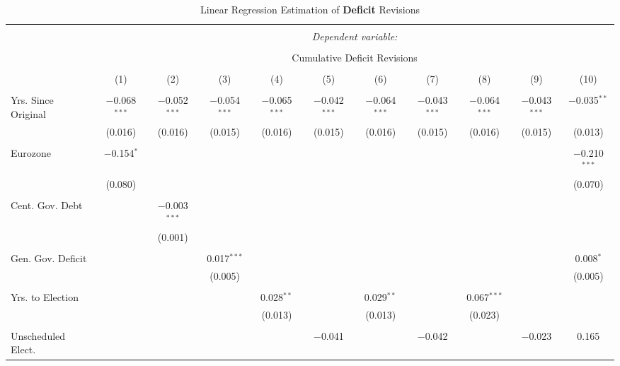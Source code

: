 
\begin{table}[!htbp] \centering 
  \caption{Linear Regression Estimation of \textbf{Deficit} Revisions} 
  \label{deficit_results} 
\tiny 
\begin{tabular}{@{\extracolsep{5pt}}lcccccccccc} 
\\[-1.8ex]\hline 
\hline \\[-1.8ex] 
 & \multicolumn{10}{c}{\textit{Dependent variable:}} \\ 
\cline{2-11} 
\\[-1.8ex] & \multicolumn{10}{c}{Cumulative Deficit Revisions} \\ 
\\[-1.8ex] & (1) & (2) & (3) & (4) & (5) & (6) & (7) & (8) & (9) & (10)\\ 
\hline \\[-1.8ex] 
 Yrs. Since Original & $-$0.068$^{***}$ & $-$0.052$^{***}$ & $-$0.054$^{***}$ & $-$0.065$^{***}$ & $-$0.042$^{***}$ & $-$0.064$^{***}$ & $-$0.043$^{***}$ & $-$0.064$^{***}$ & $-$0.043$^{***}$ & $-$0.035$^{**}$ \\ 
  & (0.016) & (0.016) & (0.015) & (0.016) & (0.015) & (0.016) & (0.015) & (0.016) & (0.015) & (0.013) \\ 
  & & & & & & & & & & \\ 
 Eurozone & $-$0.154$^{*}$ &  &  &  &  &  &  &  &  & $-$0.210$^{***}$ \\ 
  & (0.080) &  &  &  &  &  &  &  &  & (0.070) \\ 
  & & & & & & & & & & \\ 
 Cent. Gov. Debt &  & $-$0.003$^{***}$ &  &  &  &  &  &  &  &  \\ 
  &  & (0.001) &  &  &  &  &  &  &  &  \\ 
  & & & & & & & & & & \\ 
 Gen. Gov. Deficit &  &  & 0.017$^{***}$ &  &  &  &  &  &  & 0.008$^{*}$ \\ 
  &  &  & (0.005) &  &  &  &  &  &  & (0.005) \\ 
  & & & & & & & & & & \\ 
 Yrs. to Election &  &  &  & 0.028$^{**}$ &  & 0.029$^{**}$ &  & 0.067$^{***}$ &  &  \\ 
  &  &  &  & (0.013) &  & (0.013) &  & (0.023) &  &  \\ 
  & & & & & & & & & & \\ 
 Unscheduled Elect. &  &  &  &  & $-$0.041 &  & $-$0.042 &  & $-$0.023 & 0.165 \\ 

\end{tabular}
\end{table}
